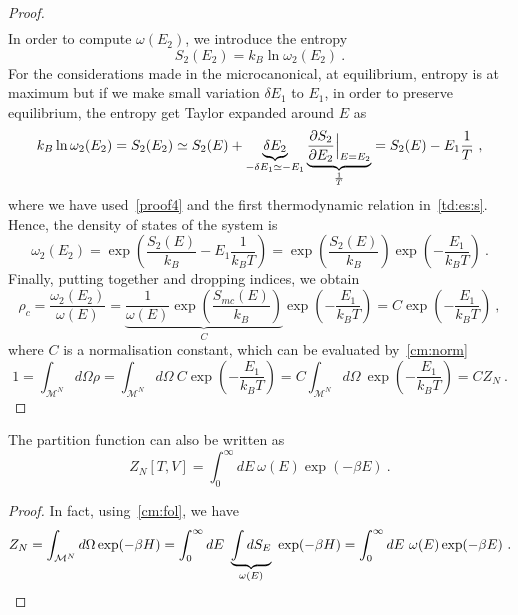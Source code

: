 \begin{proof}
\begin{equation*}
\begin{aligned}
        \end{aligned}
        \end{equation*}
        In order to compute $\omega(E_2)$, we introduce the entropy 
        \begin{equation*}
            S_2 (E_2) = k_B \ln \omega_2 (E_2) ~.
        \end{equation*}
        For the considerations made in the microcanonical, at equilibrium, entropy is at maximum but if we make small variation $\delta E_1$ to $E_1$, in order to preserve equilibrium, the entropy get Taylor expanded around $E$ as
        \begin{equation*}
            k_B \ln \omega_2 (E_2) = S_2 (E_2) \simeq S_2(E) + \underbrace{\delta E_2}_{- \delta E_1 \simeq - E_1} \underbrace{\frac{\partial S_2}{\partial E_2} \Big \vert_{E = E_2}}_{\frac{1}{T}} = S_2 (E) - E_1 \frac{1}{T} ~,
        \end{equation*} 
        where we have used~\eqref{proof4} and the first thermodynamic relation in~\eqref{td:es:s}. Hence, the density of states of the system is
        \begin{equation*}
            \omega_2 (E_2) = \exp (\frac{S_2 (E)}{k_B} - E_1 \frac{1}{k_B T}) = \exp (\frac{S_2 (E)}{k_B}) \exp (- \frac{E_1}{k_B T}) ~.
        \end{equation*}
        Finally, putting together and dropping indices, we obtain
        \begin{equation}
            \rho_c = \frac{\omega_2 (E_2)}{\omega(E)} = \underbrace{\frac{1}{\omega(E)} \exp (\frac{S_{mc}(E)}{k_B})}_C \exp (- \frac{E_1}{k_B T}) = C \exp (- \frac{E_1}{k_B T}) ~,
        \end{equation}
        where $C$ is a normalisation constant, which can be evaluated by~\eqref{cm:norm}
        \begin{equation*}
            1 = \int_{\mathcal M^N} d\Omega \rho = \int_{\mathcal M^N} d\Omega ~ C \exp (- \frac{E_1}{k_B T}) = C \int_{\mathcal M^N} d\Omega ~ \exp (- \frac{E_1}{k_B T}) = C Z_N ~. 
        \end{equation*}
    \end{proof}

    The partition function can also be written as 
    \begin{equation*}
        Z_N[T, V] = \int_{0}^{\infty} dE~ \omega(E) \exp (-\beta E) ~.
    \end{equation*}
    \begin{proof}
        In fact, using~\eqref{cm:fol}, we have
        \begin{equation*}
            Z_N = \int_{\mathcal M^N} d\Omega \exp (- \beta H) = \int_{0}^{\infty}dE~ \underbrace{\int dS_E}_{\omega(E)} ~ \exp (-\beta H) = \int_{0}^{\infty}dE~ \omega(E) \exp (-\beta E) ~.
        \end{equation*}
    \end{proof}

